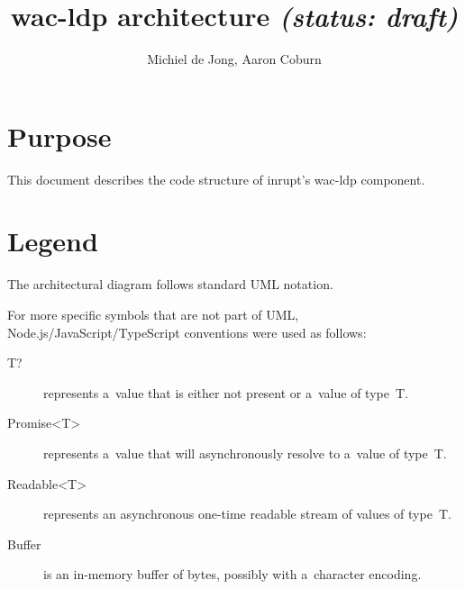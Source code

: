 \documentclass[10pt]{article}
\title{
  wac-ldp architecture
  \it (status: draft)
}
\author{Michiel de Jong, Aaron Coburn}
\begin{document}
\maketitle


\section*{Purpose}
This document describes the code structure of inrupt's wac-ldp component.


\section*{Legend}
The architectural diagram follows standard UML notation.

For more specific symbols that are not part of UML,
Node.js/JavaScript/TypeScript conventions were used as follows:

\begin{description}
  \item[T?] represents a~value that is either not present
            or a~value of type~T.
  \item[Promise<T>] represents a~value that will asynchronously resolve
                    to a~value of type~T.
  \item[Readable<T>] represents an asynchronous one-time readable stream
                     of values of type~T.
  \item[Buffer] is an in-memory buffer of bytes,
                possibly with a~character encoding.
\end{description}


\newcommand\StoreManagerBody{%
  + delete (url: URL): Promise<void>\\
  + exists (url: URL): Promise<boolean>\\
  + getResourceData (url: URL): Promise<ResourceData>\\
  + addQuad (quad: Quad): Promise<void>\\
  + deleteMatches (pattern: Pattern): Promise<void>\\
  + match (pattern: Pattern): Promise<Array<Quad>>\\
  + subjectsMatching (pattern: Pattern): Promise<Array<RdfJsTerm>>\\
  + predicatesMatching (pattern: Pattern): Promise<Array<RdfJsTerm>>\\
  + objectsMatching (pattern: Pattern): Promise<Array<RdfJsTerm>>\\
  + getRepresentation (url: URL, options?: any): Promise<ResourceData>\\
  + setRepresentation (url: URL, metaData: ResourceData): Promise<void>\\
  + load (url: URL): Promise<void>\\
  + save (url: URL): Promise<void>\\
  + patch (url: URL, sparqlQuery: string, appendOnly: boolean): Promise<void>\\
  + flushCache (url: URL): void\\

}
\end{document}
